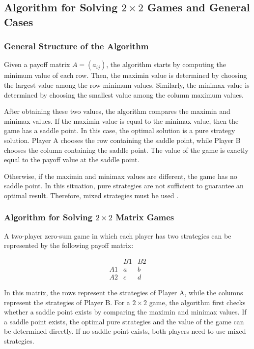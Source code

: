 \documentclass[12pt,a4paper]{article}
\begin{document}
\subsection{Algorithm for Solving \(2 \times 2\) Games and General Cases}

\subsubsection{General Structure of the Algorithm}

Given a payoff matrix \(A = (a_{ij})\), the algorithm starts by computing the minimum value of each row. Then, the maximin value is determined by choosing the largest value among the row minimum values. Similarly, the minimax value is determined by choosing the smallest value among the column maximum values.

After obtaining these two values, the algorithm compares the maximin and minimax values. If the maximin value is equal to the minimax value, then the game has a saddle point. In this case, the optimal solution is a pure strategy solution. Player A chooses the row containing the saddle point, while Player B chooses the column containing the saddle point. The value of the game is exactly equal to the payoff value at the saddle point.

Otherwise, if the maximin and minimax values are different, the game has no saddle point. In this situation, pure strategies are not sufficient to guarantee an optimal result. Therefore, mixed strategies must be used \cite{murthy2007}. 

\subsubsection{Algorithm for Solving \(2 \times 2\) Matrix Games}

A two-player zero-sum game in which each player has two strategies can be represented by the following payoff matrix:

\begingroup
\small
\renewcommand{\arraystretch}{0.75}
\setlength{\arraycolsep}{4pt}
\[
\begin{array}{c|cc}
 & B1 & B2\\
\hline
A1 & a & b \\
A2 & c & d
\end{array}
\]
\endgroup

In this matrix, the rows represent the strategies of Player A, while the columns represent the strategies of Player B. For a \(2 \times 2\) game, the algorithm first checks whether a saddle point exists by comparing the maximin and minimax values. If a saddle point exists, the optimal pure strategies and the value of the game can be determined directly. If no saddle point exists, both players need to use mixed strategies.
\end{document}
